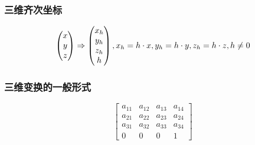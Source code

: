 \documentclass{article}
\begin{document}
\begin{CJK}{UTF8}{gbsn}
	\subsubsection{三维齐次坐标}
	$$
	\begin{pmatrix}
	x\\y\\z
	\end{pmatrix}
	\Rightarrow\begin{pmatrix}
	x_h\\y_h\\z_h\\h
	\end{pmatrix},x_h=h\cdot x,y_h=h\cdot y,z_h=h\cdot z,h\neq 0\\
	$$
	\subsubsection{三维变换的一般形式}
	$$
	\begin{bmatrix}
	a_{11}&a_{12}&a_{13}&a_{14}\\
	a_{21}&a_{22}&a_{23}&a_{24}\\
	a_{31}&a_{32}&a_{33}&a_{34}\\
	0&0&0&1
	\end{bmatrix}
	$$

\end{CJK}
\end{document}
